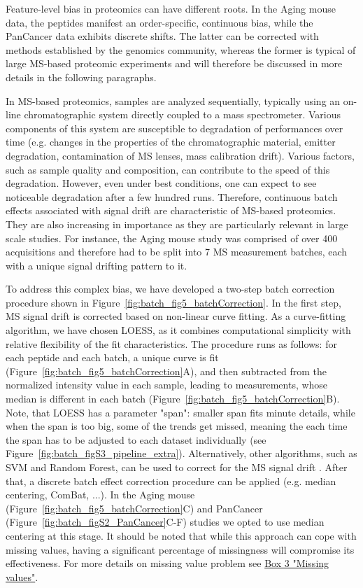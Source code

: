 \documentclass[num-refs]{wiley-article}
\begin{document}
Feature-level bias in proteomics can have different roots. In the Aging mouse data, the peptides manifest an order-specific, continuous bias, while the PanCancer data exhibits discrete shifts. The latter can be corrected with methods established by the genomics community, whereas the former is typical of large MS-based proteomic experiments and will therefore be discussed in more details in the following paragraphs.

In MS-based proteomics, samples are analyzed sequentially, typically using an on-line chromatographic system directly coupled to a mass spectrometer. Various components of this system are susceptible to degradation of performances over time (e.g. changes in the properties of the chromatographic material, emitter degradation, contamination of MS lenses, mass calibration drift). Various factors, such as sample quality and composition, can contribute to the speed of this degradation. However, even under best conditions, one can expect to see noticeable degradation after a few hundred runs. Therefore, continuous batch effects associated with signal drift are characteristic of MS-based proteomics. They are also increasing in importance as they are particularly relevant in large scale studies. For instance, the Aging mouse study was comprised of over 400 acquisitions and therefore had to be split into 7 MS measurement batches, each with a unique signal drifting pattern to it.

To address this complex bias, we have developed a two-step batch correction procedure shown in Figure~\ref{fig:batch_fig5_batchCorrection}. In the first step, MS signal drift is corrected based on non-linear curve fitting. As a curve-fitting algorithm, we have chosen LOESS, as it combines computational simplicity with relative flexibility of the fit characteristics. The procedure runs as follows: for each peptide and each batch, a unique curve is fit (Figure~\ref{fig:batch_fig5_batchCorrection}A), and then subtracted from the normalized intensity value in each sample, leading to measurements, whose median is different in each batch (Figure~\ref{fig:batch_fig5_batchCorrection}B). Note, that LOESS has a parameter "span": smaller span fits minute details, while when the span is too big, some of the trends get missed, meaning the each time the span has to be adjusted to each dataset individually (see Figure~\ref{fig:batch_figS3_pipeline_extra}). Alternatively, other algorithms, such as SVM and Random Forest, can be used to correct for the MS signal drift \cite{Luan2018, Shen2016}. After that, a discrete batch effect correction procedure can be applied (e.g. median centering, ComBat, ...). In the Aging mouse (Figure~\ref{fig:batch_fig5_batchCorrection}C) and PanCancer (Figure~\ref{fig:batch_figS2_PanCancer}C-F) studies we opted to use median centering at this stage. It should be noted that while this approach can cope with missing values, having a significant percentage of missingness will compromise its effectiveness. For more details on missing value problem see \hyperref[box:Box3_missingness]{Box 3 "Missing values"}.
\end{document}
